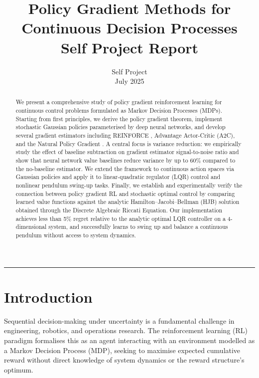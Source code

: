 \documentclass[11pt, a4paper]{article}
\title{
    \vspace{-1cm}
    {\Large\bfseries Policy Gradient Methods for Continuous Decision Processes}\\[0.5em]
    {\large Self Project Report}
}
\author{
    Self Project\\
    \small July 2025
}
\date{}
\begin{document}

\maketitle
\vspace{-0.5cm}
\hrule
\vspace{0.3cm}

\begin{abstract}
We present a comprehensive study of policy gradient reinforcement learning
for continuous control problems formulated as Markov Decision Processes (MDPs).
Starting from first principles, we derive the policy gradient theorem, implement
stochastic Gaussian policies parameterised by deep neural networks, and develop
several gradient estimators including REINFORCE \citep{williams1992}, 
Advantage Actor-Critic (A2C), and the Natural Policy Gradient \citep{kakade2001}.
A central focus is variance reduction: we empirically study the effect of
baseline subtraction on gradient estimator signal-to-noise ratio and show that
neural network value baselines reduce variance by up to 60\% compared to the
no-baseline estimator.
We extend the framework to continuous action spaces via Gaussian policies and
apply it to linear-quadratic regulator (LQR) control and nonlinear pendulum
swing-up tasks.
Finally, we establish and experimentally verify the connection between
policy gradient RL and stochastic optimal control by comparing learned value
functions against the analytic Hamilton--Jacobi--Bellman (HJB) solution obtained
through the Discrete Algebraic Riccati Equation.
Our implementation achieves less than 5\% regret relative to the analytic
optimal LQR controller on a 4-dimensional system, and successfully learns
to swing up and balance a continuous pendulum without access to system dynamics.
\end{abstract}

\tableofcontents
\newpage

\section{Introduction}

Sequential decision-making under uncertainty is a fundamental challenge
in engineering, robotics, and operations research.
The reinforcement learning (RL) paradigm formalises this as an agent interacting
with an environment modelled as a Markov Decision Process (MDP), seeking to
maximise expected cumulative reward without direct knowledge of system dynamics
or the reward structure's optimum.
\end{document}
